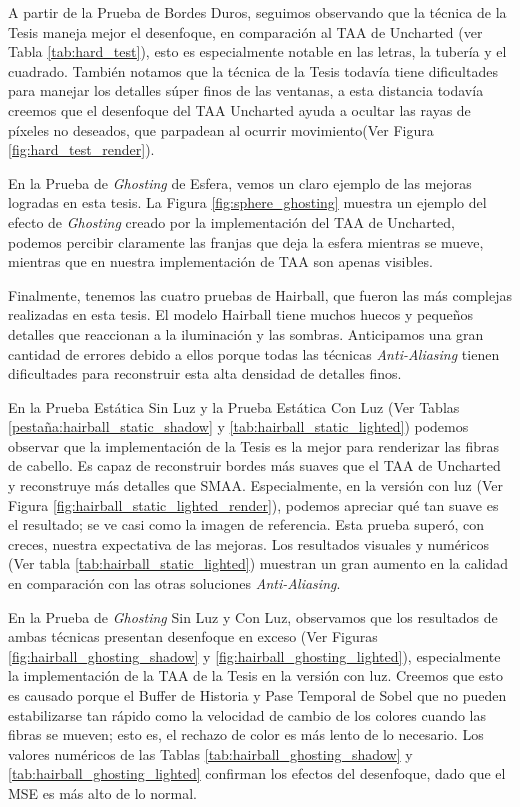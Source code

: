 \documentclass[pregrado]{tesis-usb} %
\begin{document}
A partir de la Prueba de Bordes Duros, seguimos observando que la técnica de la Tesis maneja mejor el desenfoque, en comparación al TAA de Uncharted (ver Tabla \ref{tab:hard_test}), esto es especialmente notable en las letras, la tubería y el cuadrado. También notamos que la técnica de la Tesis todavía tiene dificultades para manejar los detalles súper finos de las ventanas, a esta distancia todavía creemos que el desenfoque del TAA Uncharted ayuda a ocultar las rayas de píxeles no deseados, que parpadean al ocurrir movimiento(Ver Figura \ref{fig:hard_test_render}).

En la Prueba de \textit{Ghosting} de Esfera, vemos un claro ejemplo de las mejoras logradas en esta tesis. La Figura \ref{fig:sphere_ghosting} muestra un ejemplo del efecto de \textit{Ghosting} creado por la implementación del TAA de Uncharted, podemos percibir claramente las franjas que deja la esfera mientras se mueve, mientras que en nuestra implementación de TAA son apenas visibles.

Finalmente, tenemos las cuatro pruebas de Hairball, que fueron las más complejas realizadas en esta tesis. El modelo Hairball tiene muchos huecos y pequeños detalles que reaccionan a la iluminación y las sombras. Anticipamos una gran cantidad de errores debido a ellos porque todas las técnicas \textit{Anti-Aliasing} tienen dificultades para reconstruir esta alta densidad de detalles finos.

En la Prueba Estática Sin Luz y la Prueba Estática Con Luz (Ver Tablas \ref{pestaña:hairball_static_shadow} y \ref{tab:hairball_static_lighted}) podemos observar que la implementación de la Tesis es la mejor para renderizar las fibras de cabello. Es capaz de reconstruir bordes más suaves que el TAA de Uncharted y reconstruye más detalles que SMAA. Especialmente, en la versión con luz (Ver Figura \ref{fig:hairball_static_lighted_render}), podemos apreciar qué tan suave es el resultado; se ve casi como la imagen de referencia. Esta prueba superó, con creces, nuestra expectativa de las mejoras. Los resultados visuales y numéricos (Ver tabla \ref{tab:hairball_static_lighted}) muestran un gran aumento en la calidad en comparación con las otras soluciones \textit{Anti-Aliasing}.

En la Prueba de \textit{Ghosting} Sin Luz y Con Luz, observamos que los resultados de ambas técnicas presentan desenfoque en exceso (Ver Figuras \ref{fig:hairball_ghosting_shadow} y \ref{fig:hairball_ghosting_lighted}), especialmente la implementación de la TAA de la Tesis en la versión con luz. Creemos que esto es causado porque el Buffer de Historia y Pase Temporal de Sobel que no pueden estabilizarse tan rápido como la velocidad de cambio de los colores cuando las fibras se mueven; esto es, el rechazo de color es más lento de lo necesario. Los valores numéricos de las Tablas \ref{tab:hairball_ghosting_shadow} y \ref{tab:hairball_ghosting_lighted} confirman los efectos del desenfoque, dado que el MSE es más alto de lo normal.
\end{document}
